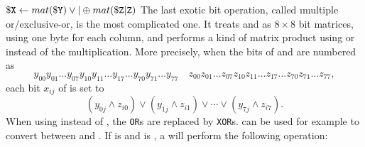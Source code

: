 \instrtbl
	{}
	{${\tt \$X} \leftarrow mat({\tt \$Y}) \lor|\oplus mat({\tt \$Z}{\tt|Z})$}
\noindent The last exotic bit operation, called \i{multiple or/exclusive-or}, is the most complicated one. It treats  and  as $8 \times 8$ bit matrices, using one byte for each column, and performs a kind of matrix product using  or  instead of the multiplication. More precisely, when the bits of  and  are numbered as
$$y_{00}y_{01}\ldots y_{07}y_{10}y_{11}\ldots y_{17}\ldots y_{70}y_{71}\ldots y_{77}\quad
z_{00}z_{01}\ldots z_{07}z_{10}z_{11}\ldots z_{17}\ldots z_{70}z_{71}\ldots z_{77},$$
each bit $x_{ij}$ of  is set to
$$(y_{0j}\land z_{i0})\lor (y_{1j}\land z_{i1})\lor \cdots \lor (y_{7j}\land z_{i7}).$$
When using  instead of , the {\tt OR}s are replaced by {\tt XOR}s.  can be used for example to convert between  and . \citep[pg. 9]{mmix-doc} If  is  and  is , a  will perform the following operation:
